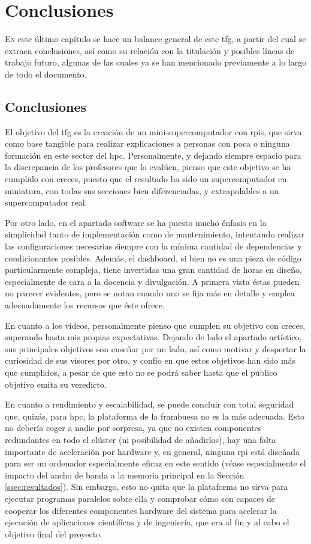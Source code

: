 \chapter{Conclusiones}
\label{chap:conclusiones}

\lettrine{E}{n} este último capítulo se hace un balance general de este \acrlong{tfg}, a partir del cual se extraen conclusiones, así como su relación con la titulación y posibles líneas de trabajo futuro, algunas de las cuales ya se han mencionado previamente a lo largo de todo el documento.

\section{Conclusiones}
El objetivo del \acrshort{tfg} es la creación de un mini-supercomputador con \acrlong{rpi}s, que sirva como base tangible para realizar explicaciones a personas con poca o ninguna formación en este sector del \acrshort{hpc}. Personalmente, y dejando siempre espacio para la discrepancia de los profesores que lo evalúen, pienso que este objetivo se ha cumplido con creces, puesto que el resultado ha sido un supercomputador en miniatura, con todas sus secciones bien diferenciadas, y extrapolables a un supercomputador real. 

Por otro lado, en el apartado software se ha puesto mucho énfasis en la simplicidad tanto de implementación como de mantenimiento, intentando realizar las configuraciones necesarias siempre con la mínima cantidad de dependencias y condicionantes posibles. Además, el dashboard, si bien no es una pieza de código particularmente compleja, tiene invertidas una gran cantidad de horas en diseño, especialmente de cara a la docencia y divulgación. A primera vista éstas pueden no parecer evidentes, pero se notan cuando uno se fija más en detalle y emplea adecuadamente los recursos que éste ofrece.

En cuanto a los vídeos, personalmente pienso que cumplen su objetivo con creces, superando hasta mis propias expectativas. Dejando de lado el apartado artístico, sus principales objetivos son enseñar por un lado, así como motivar y despertar la curiosidad de sus visores por otro, y confío en que estos objetivos han sido más que cumplidos, a pesar de que esto no se podrá saber hasta que el público objetivo emita su veredicto.

En cuanto a rendimiento y escalabilidad, se puede concluir con total seguridad que, quizás, para \acrshort{hpc}, la plataforma de la frambuesa no es la más adecuada. Esto no debería coger a nadie por sorpresa, ya que no existen componentes redundantes en todo el clúster (ni posibilidad de añadirlos), hay una falta importante de aceleración por hardware y, en general, ninguna \acrlong{rpi} está diseñada para ser un ordenador especialmente eficaz en este sentido (véase especialmente el impacto del ancho de banda a la memoria principal en la Sección \ref{ssec:resultados}). Sin embargo, esto no quita que la plataforma no sirva para ejecutar programas paralelos sobre ella y comprobar cómo son capaces de cooperar los diferentes componentes hardware del sistema para acelerar la ejecución de aplicaciones científicas y de ingeniería, que era al fin y al cabo el objetivo final del proyecto.


